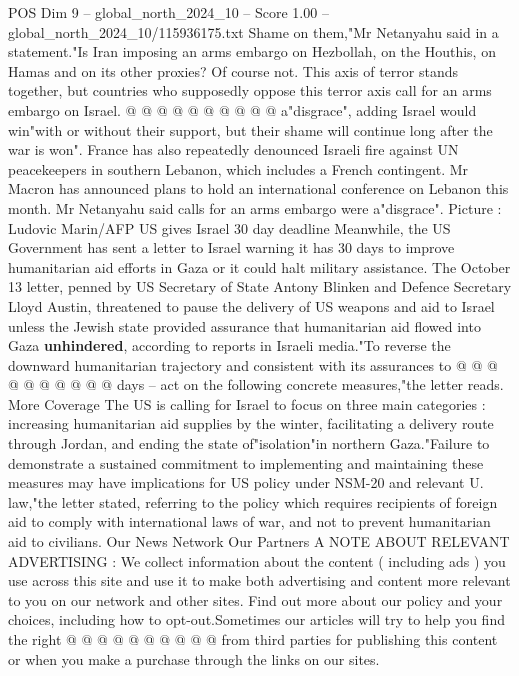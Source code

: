 \begin{textsample}{POS Dim 9 – global\_north\_2024\_10 – Score 1.00 – global\_north\_2024\_10/115936175.txt}
Shame on them,"Mr Netanyahu said in a statement."Is Iran imposing an arms embargo on Hezbollah, on the Houthis, on Hamas and on its other proxies?
Of course not.
This axis of terror stands together, but countries who supposedly oppose this terror axis call for an arms embargo on Israel. @ @ @ @ @ @ @ @ @ @ a"disgrace", adding Israel would win"with or without their support, but their shame will continue long after the war is won".
France has also repeatedly denounced Israeli fire against UN peacekeepers in southern Lebanon, which includes a French contingent.
Mr Macron has announced plans to hold an international conference on Lebanon this month.
Mr Netanyahu said calls for an arms embargo were a"disgrace".
Picture : Ludovic Marin/AFP US gives Israel 30 day deadline Meanwhile, the US Government has sent a letter to Israel warning it has 30 days to improve humanitarian aid efforts in Gaza or it could halt military assistance.
The October 13 letter, penned by US Secretary of State Antony Blinken and Defence Secretary Lloyd Austin, threatened to pause the delivery of US weapons and aid to Israel unless the Jewish state provided assurance that humanitarian aid flowed into Gaza \textbf{unhindered}, according to reports in Israeli media."To reverse the downward humanitarian trajectory and consistent with its assurances to @ @ @ @ @ @ @ @ @ @ days -- act on the following concrete measures,"the letter reads.
More Coverage The US is calling for Israel to focus on three main categories : increasing humanitarian aid supplies by the winter, facilitating a delivery route through Jordan, and ending the state of"isolation"in northern Gaza."Failure to demonstrate a sustained commitment to implementing and maintaining these measures may have implications for US policy under NSM-20 and relevant U. law,"the letter stated, referring to the policy which requires recipients of foreign aid to comply with international laws of war, and not to prevent humanitarian aid to civilians.
Our News Network Our Partners A NOTE ABOUT RELEVANT ADVERTISING : We collect information about the content ( including ads ) you use across this site and use it to make both advertising and content more relevant to you on our network and other sites.
Find out more about our policy and your choices, including how to opt-out.Sometimes our articles will try to help you find the right @ @ @ @ @ @ @ @ @ @ from third parties for publishing this content or when you make a purchase through the links on our sites.

\end{textsample}
